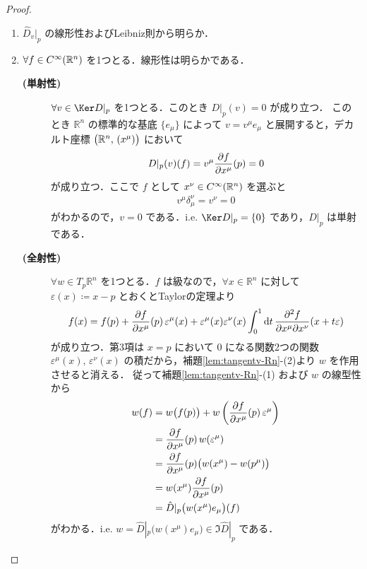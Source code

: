 \documentclass[geometry_main]{subfiles}
\begin{document}
\begin{proof}
	\begin{enumerate}
		\item $\hat{D}_{v}|_p$ の線形性およびLeibniz則から明らか．
		\item $\forall f \in C^\infty(\mathbb{R}^n)$ を1つとる．線形性は明らかである．
		\begin{description}
			\item[\textbf{(単射性)}] $\forall v \in \Ker D|_p$ を1つとる．このとき $D|_p (v) = 0$ が成り立つ．
			このとき $\mathbb{R}^n$ の標準的な基底 $\{e_\mu\}$ によって $v = v^\mu e_\mu$ と展開すると，デカルト座標 $\bigl(\mathbb{R}^n,\, (x^\mu)\bigr)$ において
			\begin{align}
				D|_p(v)(f) = v^\mu \pdv{f}{x^\mu} ()(p) = 0
			\end{align}
			が成り立つ．ここで $f$ として $x^\nu\in C^\infty(\mathbb{R}^n)$ を選ぶと
			\begin{align}
				v^\mu \delta^\nu_\mu = v^\nu = 0
			\end{align}
			がわかるので，$v = 0$ である．i.e. $\Ker D|_p = \{0\}$ であり，$D|_p$ は単射である．
			\item[\textbf{(全射性)}] 
			$\forall w \in T_p \mathbb{R}^n$ を1つとる．$f$ は\cinfty 級なので，$\forall x \in \mathbb{R}^n$ に対して $\varepsilon(x) \coloneqq x-p$ とおくとTaylorの定理より
			\begin{align}
				f(x) = f(p) + \pdv{f}{x^\mu}()(p)\, \varepsilon^\mu (x) + \varepsilon^\mu (x) \varepsilon^\nu (x) \int_0^1 \dd{t} \pdv[2]{f}{x^\mu}{x^\nu}()(x + t \varepsilon)
			\end{align}
			が成り立つ．第3項は $x=p$ において $0$ になる関数2つの\cinfty 関数 $\varepsilon^\mu (x),\, \varepsilon^\nu(x)$ の積だから，補題\ref{lem:tangentv-Rn}-(2)より $w$ を作用させると消える．
			従って補題\ref{lem:tangentv-Rn}-(1) および $w$ の線型性から
			\begin{align}
				w(f) 
				&= w \bigl( f(p) \bigr) + w \left( \pdv{f}{x^\mu}()(p)\, \varepsilon^\mu \right) \\
				&= \pdv{f}{x^\mu}()(p)\, w ( \varepsilon^\mu ) \\
				&= \pdv{f}{x^\mu}()(p)\bigl(w(x^\mu) - w(p^\mu)\bigr) \\
				&= w(x^\mu) \pdv{f}{x^\mu}()(p) \\
				&= \hat{D}|_p \bigl( w(x^\mu)e_\mu \bigr) (f)
			\end{align}
			がわかる．i.e. $w = \hat{D}|_p \bigl( w(x^\mu)e_\mu \bigr) \in \Im \hat{D}|_p$ である．
		\end{description}
	\end{enumerate}
\end{proof}
\end{document}
